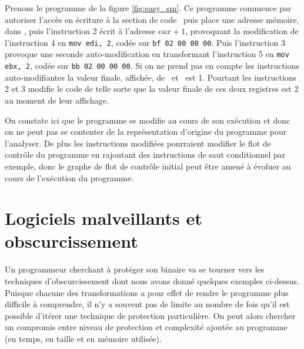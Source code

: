 
Prenons le programme de la figure \ref{fig:easy_sm}. Ce programme commence par autoriser l'accès en écriture à la section de code \ptext\ puis place une adresse mémoire,  dans \eax, puis l'instruction 2 écrit à l'adresse $eax+1$, provoquant la modification de l'instruction 4 en \texttt{mov edi, 2}, codée sur \texttt{bf 02 00 00 00}.
Puis l'instruction 3 provoque une seconde auto-modification en transformant l'instruction 5 en \texttt{mov ebx, 2}, codée sur \texttt{bb 02 00 00 00}.
Si on ne prend pas en compte les instructions auto-modifiantes la valeur finale, affichée, de \edi\ et \ebx\ est 1.
Pourtant les instructions 2 et 3 modifie le code de telle sorte que la valeur finale de ces deux registres est 2 au moment de leur affichage.

On constate ici que le programme se modifie au cours de son exécution et donc on ne peut pas se contenter de la représentation d'origine du programme pour l'analyser.
De plus les instructions modifiées pourraient modifier le flot de contrôle du programme en rajoutant des instructions de saut conditionnel par exemple, donc le graphe de flot de contrôle initial peut être amené à évoluer au cours de l'exécution du programme.


\section{Logiciels malveillants et obscurcissement}
Un programmeur cherchant à protéger son binaire va se tourner vers les techniques d'obscurcissement dont nous avons donné quelques exemples ci-dessus. Puisque chacune des transformations a pour effet de rendre le programme plus difficile à comprendre, il n'y a souvent pas de limite au nombre de fois qu'il est possible d'itérer une technique de protection particulière. On peut alors chercher un compromis entre niveau de protection et complexité ajoutée au programme (en temps, en taille et en mémoire utilisée).

